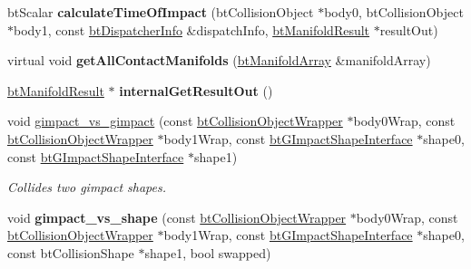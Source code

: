 \begin{DoxyCompactItemize}
\item 
\mbox{\label{classbtGImpactCollisionAlgorithm_a327988a10bfd16b5841ec413130763ae}} 
bt\+Scalar {\bfseries calculate\+Time\+Of\+Impact} (bt\+Collision\+Object $\ast$body0, bt\+Collision\+Object $\ast$body1, const \hyperlink{structbtDispatcherInfo}{bt\+Dispatcher\+Info} \&dispatch\+Info, \hyperlink{classbtManifoldResult}{bt\+Manifold\+Result} $\ast$result\+Out)
\item 
\mbox{\label{classbtGImpactCollisionAlgorithm_ac635d6eb2bfbdad148479f0fc2d24d9b}} 
virtual void {\bfseries get\+All\+Contact\+Manifolds} (\hyperlink{classbtAlignedObjectArray}{bt\+Manifold\+Array} \&manifold\+Array)
\item 
\mbox{\label{classbtGImpactCollisionAlgorithm_a5fd65bced2a59243765e665855ee7566}} 
\hyperlink{classbtManifoldResult}{bt\+Manifold\+Result} $\ast$ {\bfseries internal\+Get\+Result\+Out} ()
\item 
void \hyperlink{classbtGImpactCollisionAlgorithm_a2a6bd5ca4d26e3578d2613543e85429b}{gimpact\+\_\+vs\+\_\+gimpact} (const \hyperlink{structbtCollisionObjectWrapper}{bt\+Collision\+Object\+Wrapper} $\ast$body0\+Wrap, const \hyperlink{structbtCollisionObjectWrapper}{bt\+Collision\+Object\+Wrapper} $\ast$body1\+Wrap, const \hyperlink{classbtGImpactShapeInterface}{bt\+G\+Impact\+Shape\+Interface} $\ast$shape0, const \hyperlink{classbtGImpactShapeInterface}{bt\+G\+Impact\+Shape\+Interface} $\ast$shape1)
\begin{DoxyCompactList}\small\item\em Collides two gimpact shapes. \end{DoxyCompactList}\item 
\mbox{\label{classbtGImpactCollisionAlgorithm_a41595f270e49daf44f550b6a032dd3b0}} 
void {\bfseries gimpact\+\_\+vs\+\_\+shape} (const \hyperlink{structbtCollisionObjectWrapper}{bt\+Collision\+Object\+Wrapper} $\ast$body0\+Wrap, const \hyperlink{structbtCollisionObjectWrapper}{bt\+Collision\+Object\+Wrapper} $\ast$body1\+Wrap, const \hyperlink{classbtGImpactShapeInterface}{bt\+G\+Impact\+Shape\+Interface} $\ast$shape0, const bt\+Collision\+Shape $\ast$shape1, bool swapped)
\item 
\mbox{\label{classbtGImpactCollisionAlgorithm_a2e4f46acaa4551a7f82ee91e710f925a}} 

\end{DoxyCompactItemize}
